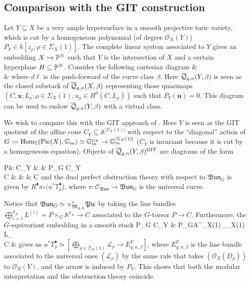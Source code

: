\subsection{Comparison with the GIT construction} \label{Section comparison with GIT construction}

Let $Y\subseteq X$ be a very ample hypersurface in a smooth projective toric variety, which is cut by a homogeneous polynomial (of degree $\mathcal O_X(Y)$) $P_Y\in k[z_\rho : \rho \in \Sigma_X(1)]$. The complete linear system associated to $Y$ gives an embedding $X\hookrightarrow \mathbb P^N$ such that $Y$ is the intersection of $X$ and a certain hyperplane $H\subseteq\mathbb P^N$. Consider the following cartesian diagram
\bcd
{}\ar[d]\ar[r] & \ar[d,"k"] \\
\ar[r] & 
\ecd
where $d\ell$ is the push-forward of the curve class $\beta$. Here $\overline{\mathcal Q}_{g,n}(Y,\beta)$ is seen as the closed substack of $\overline{\mathcal Q}_{g,n}(X,\beta)$ representing those quasimaps $(C,\mathbf x;L_\rho\colon\rho\in\Sigma_X(1),u_\rho\in H^0(C,L_\rho))$ such that $P_Y(\mathbf u)=0$. This diagram can be used to endow $\overline{\mathcal Q}_{g,n}(Y,\beta)$ with a virtual class.

We wish to compare this with the GIT approach of \cite{CFKM}. Here $Y$ is seen as the GIT quotient of the affine cone $C_Y\subseteq \mathbb A^{\lvert\Sigma_X(1)\rvert}$ with respect to the ``diagonal'' action of $G:=\operatorname{Hom}_{\mathbb Z}(\operatorname{Pic}(X),\mathbb{G}_m)\simeq\mathbb{G}_m^{\rho_X}\rightarrow \mathbb{G}_m^{\lvert\Sigma_X(1)\rvert}$ ($C_Y$ is invariant because it is cut by a homogeneous equation). Objects of $\overline{\mathcal Q}_{g,n}(Y,\beta)^\text{GIT}$ are diagrams of the form

\bcd
P\ar[d,"G"]\ar[r] & C_Y &  & P\times_{G} C_Y  \\
C & & & C 
\ecd
and the dual perfect obstruction theory with respect to $\mathfrak{Bun}_{G}$ is given by $R^\bullet\pi_*(u^*\mathbb T^\bullet_\rho$), where $\pi\colon \mathcal C_{\mathfrak{Bun}}\to\mathfrak{Bun}_{G}$ is the universal curve.

Notice that $\mathfrak{Bun}_{G}\simeq\times^r_{\mathfrak M_{g,n}} \mathfrak{Pic}$ by taking the line bundles $\bigoplus_{i=1}^{\rho_X} L^{(i)}=P\times_{G}\mathbb A^{\rho_X}\to C$ associated to the $G$-torsor $P\to C$. Furthermore, the $G$-equivariant embedding in a smooth stack
\bcd
P\times_{G} C_Y \ar[r,hook] & P\times_{G}\mathbb A^{\lvert\Sigma_X(1)\rvert}\simeq \bigoplus_{\rho\in\Sigma_X(1)} L_{\rho}\ar[dl]\\
C  &
\ecd
gives us $u^*T^\bullet_\rho\simeq[\bigoplus_{\rho\in\Sigma_X(1)} \mathcal L_{\rho}\to E_{g,n,\beta}^Y]$, where $E_{g,n,\beta}^Y$ is the line bundle associated to the universal ones $(\mathcal L_\rho)$ by the same rule that takes $(\mathcal O_X(D_\rho))$ to $\mathcal O_X(Y)$, and the arrow is induced by $P_Y$. This shows that both the modular interpretation and the obstruction theory coincide.
